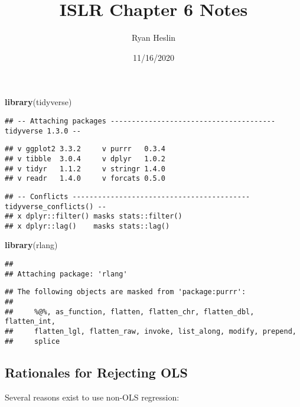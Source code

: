 \documentclass[
]{article}
\title{ISLR Chapter 6 Notes}
\author{Ryan Heslin}
\date{11/16/2020}
\newenvironment{Shaded}{\begin{snugshade}}{\end{snugshade}}
\newcommand{\KeywordTok}[1]{\textcolor[rgb]{0.13,0.29,0.53}{\textbf{#1}}}
\newcommand{\NormalTok}[1]{#1}
\begin{document}
\maketitle

\begin{Shaded}
\begin{Highlighting}[]
\KeywordTok{library}\NormalTok{(tidyverse)}
\end{Highlighting}
\end{Shaded}

\begin{verbatim}
## -- Attaching packages --------------------------------------- tidyverse 1.3.0 --
\end{verbatim}

\begin{verbatim}
## v ggplot2 3.3.2     v purrr   0.3.4
## v tibble  3.0.4     v dplyr   1.0.2
## v tidyr   1.1.2     v stringr 1.4.0
## v readr   1.4.0     v forcats 0.5.0
\end{verbatim}

\begin{verbatim}
## -- Conflicts ------------------------------------------ tidyverse_conflicts() --
## x dplyr::filter() masks stats::filter()
## x dplyr::lag()    masks stats::lag()
\end{verbatim}

\begin{Shaded}
\begin{Highlighting}[]
\KeywordTok{library}\NormalTok{(rlang)}
\end{Highlighting}
\end{Shaded}

\begin{verbatim}
## 
## Attaching package: 'rlang'
\end{verbatim}

\begin{verbatim}
## The following objects are masked from 'package:purrr':
## 
##     %@%, as_function, flatten, flatten_chr, flatten_dbl, flatten_int,
##     flatten_lgl, flatten_raw, invoke, list_along, modify, prepend,
##     splice
\end{verbatim}

\hypertarget{rationales-for-rejecting-ols}{%
\subsection{Rationales for Rejecting
OLS}\label{rationales-for-rejecting-ols}}

Several reasons exist to use non-OLS regression:
\end{document}
